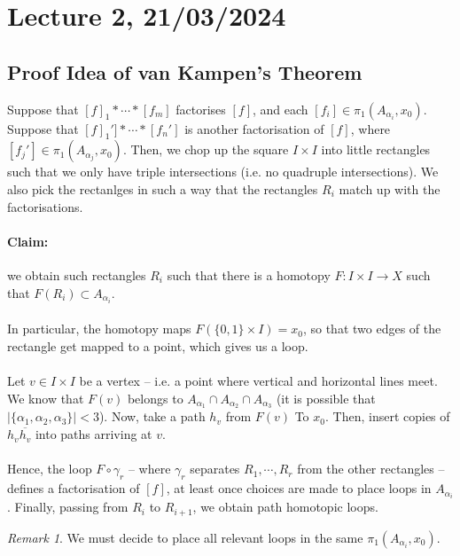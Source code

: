 \documentclass[a4paper]{report}
\theoremstyle{definition}
\theoremstyle{remark}
\newtheorem{remark}{Remark}
\theoremstyle{proposition}
\theoremstyle{conjecture}
\theoremstyle{lemma}
\theoremstyle{corollary}
\theoremstyle{exercise}
\begin{document}
\section{Lecture 2, 21/03/2024}

\subsection{Proof Idea of van Kampen's Theorem}

Suppose that $[f]_1\ast \cdots \ast [f_m]$ factorises $[f]$, and 
each $[f_i] \in \pi_1(A_{\alpha_i},x_0)$. 
Suppose that $[f]_1'] \ast \cdots \ast [f_n']$ is another factorisation
of $[f]$, where $[f_j'] \in \pi_1(A_{\alpha_j},x_0)$.
Then, we chop up the square $I \times I$ into little rectangles 
such that we only have triple intersections (i.e. no quadruple intersections).
We also pick the rectanlges in such a way that the rectangles $R_i$ match 
up with the factorisations. 
\paragraph{Claim:} we obtain such rectangles $R_i$ such that there is a 
homotopy $F : I \times I \to X$ such that $F(R_i) \subset A_{\alpha_i}$.\\\\
In particular, the homotopy maps $F(\lbrace 0,1\rbrace \times I) = x_0$, so 
that two edges of the rectangle get mapped to a point, which gives us a loop.\\\\
Let $v \in I \times I$ be a vertex -- i.e. a point where vertical and horizontal lines meet. 
We know that $F(v)$ belongs to $A_{\alpha_1} \cap A_{\alpha_2} \cap A_{\alpha_3}$
(it is possible that $\vert \lbrace \alpha_1,\alpha_2,\alpha_3\rbrace \vert < 3$).
Now, take a path $h_v$ from $F(v)$ To $x_0$. Then, insert copies of $h_v\overline{h_v}$ into paths arriving at $v$. \\\\
Hence, the loop $F \circ \gamma_r$ -- where $\gamma_r$ separates 
$R_1,\cdots,R_r$ from the other rectangles -- defines a factorisation
of $[f]$, at least once choices are made to place loops in $A_{\alpha_i}$.
Finally, passing from $R_i$ to $R_{i+1}$, we obtain 
path homotopic loops.

\begin{remark}
    We must decide to place all relevant loops in the same $\pi_1(A_{\alpha_i},x_0)$.
\end{remark}
\end{document}

